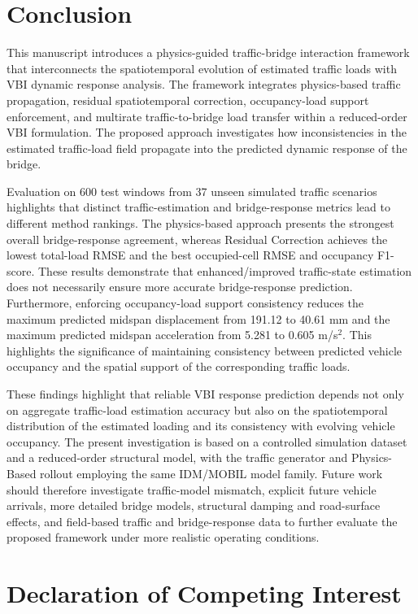 \documentclass[journal]{IEEEtran}
\begin{document}
\section{Conclusion}

This manuscript introduces a physics-guided traffic-bridge interaction framework that interconnects the spatiotemporal evolution of estimated traffic loads with VBI dynamic response analysis. The framework integrates physics-based traffic propagation, residual spatiotemporal correction, occupancy-load support enforcement, and multirate traffic-to-bridge load transfer within a reduced-order VBI formulation. The proposed approach investigates how inconsistencies in the estimated traffic-load field propagate into the predicted dynamic response of the bridge.

Evaluation on 600 test windows from 37 unseen simulated traffic scenarios highlights that distinct traffic-estimation and bridge-response metrics lead to different method rankings. The physics-based approach presents the strongest overall bridge-response agreement, whereas Residual Correction achieves the lowest total-load RMSE and the best occupied-cell RMSE and occupancy F1-score. These results demonstrate that enhanced/improved traffic-state estimation does not necessarily ensure more accurate bridge-response prediction. Furthermore, enforcing occupancy-load support consistency reduces the maximum predicted midspan displacement from 191.12 to 40.61 mm and the maximum predicted midspan acceleration from 5.281 to 0.605 m/s$^2$. This highlights the significance of maintaining consistency between predicted vehicle occupancy and the spatial support of the corresponding traffic loads.

These findings highlight that reliable VBI response prediction depends not only on aggregate traffic-load estimation accuracy but also on the spatiotemporal distribution of the estimated loading and its consistency with evolving vehicle occupancy. The present investigation is based on a controlled simulation dataset and a reduced-order structural model, with the traffic generator and Physics-Based rollout employing the same IDM/MOBIL model family. Future work should therefore investigate traffic-model mismatch, explicit future vehicle arrivals, more detailed bridge models, structural damping and road-surface effects, and field-based traffic and bridge-response data to further evaluate the proposed framework under more realistic operating conditions.

\section*{Declaration of Competing Interest}
\end{document}
